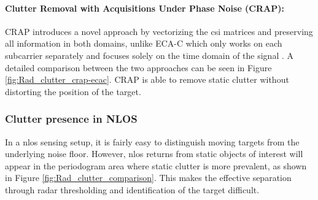 	\paragraph{Clutter Removal with Acquisitions Under Phase Noise (CRAP):}
	CRAP introduces a novel approach by vectorizing the \gls{csi} matrices and preserving all information in both domains, unlike ECA-C which only works on each subcarrier separately and focuses solely on the time domain of the signal \cite{Henninger_CRAP_2023}.
	A detailed comparison between the two approaches can be seen in Figure \ref{fig:Rad_clutter_crap-ecac}. CRAP is able to remove static clutter without distorting the position of the target.
	
	
	\subsubsection{Clutter presence in NLOS}
	
	In a \gls{nlos} sensing setup, it is fairly easy to distinguish moving targets from the underlying noise floor.
	However, \gls{nlos} returns from static objects of interest will appear in the periodogram area where static clutter is more prevalent, as shown in Figure \ref{fig:Rad_clutter_comparison}.
	This makes the effective separation through radar thresholding and identification of the target difficult.

